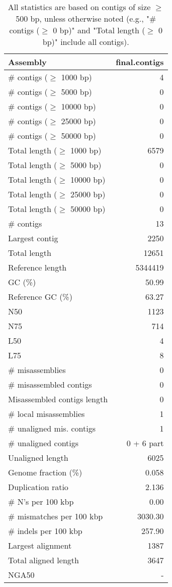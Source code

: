 \documentclass[12pt,a4paper]{article}
\begin{document}
\begin{table}[ht]
\begin{center}
\caption{All statistics are based on contigs of size $\geq$ 500 bp, unless otherwise noted (e.g., "\# contigs ($\geq$ 0 bp)" and "Total length ($\geq$ 0 bp)" include all contigs).}
\begin{tabular}{|l*{1}{|r}|}
\hline
Assembly & final.contigs \\ \hline
\# contigs ($\geq$ 1000 bp) & 4 \\ \hline
\# contigs ($\geq$ 5000 bp) & 0 \\ \hline
\# contigs ($\geq$ 10000 bp) & 0 \\ \hline
\# contigs ($\geq$ 25000 bp) & 0 \\ \hline
\# contigs ($\geq$ 50000 bp) & 0 \\ \hline
Total length ($\geq$ 1000 bp) & 6579 \\ \hline
Total length ($\geq$ 5000 bp) & 0 \\ \hline
Total length ($\geq$ 10000 bp) & 0 \\ \hline
Total length ($\geq$ 25000 bp) & 0 \\ \hline
Total length ($\geq$ 50000 bp) & 0 \\ \hline
\# contigs & 13 \\ \hline
Largest contig & 2250 \\ \hline
Total length & 12651 \\ \hline
Reference length & 5344419 \\ \hline
GC (\%) & 50.99 \\ \hline
Reference GC (\%) & 63.27 \\ \hline
N50 & 1123 \\ \hline
N75 & 714 \\ \hline
L50 & 4 \\ \hline
L75 & 8 \\ \hline
\# misassemblies & 0 \\ \hline
\# misassembled contigs & 0 \\ \hline
Misassembled contigs length & 0 \\ \hline
\# local misassemblies & 1 \\ \hline
\# unaligned mis. contigs & 1 \\ \hline
\# unaligned contigs & 0 + 6 part \\ \hline
Unaligned length & 6025 \\ \hline
Genome fraction (\%) & 0.058 \\ \hline
Duplication ratio & 2.136 \\ \hline
\# N's per 100 kbp & 0.00 \\ \hline
\# mismatches per 100 kbp & 3030.30 \\ \hline
\# indels per 100 kbp & 257.90 \\ \hline
Largest alignment & 1387 \\ \hline
Total aligned length & 3647 \\ \hline
NGA50 & - \\ \hline
\end{tabular}
\end{center}
\end{table}
\end{document}
